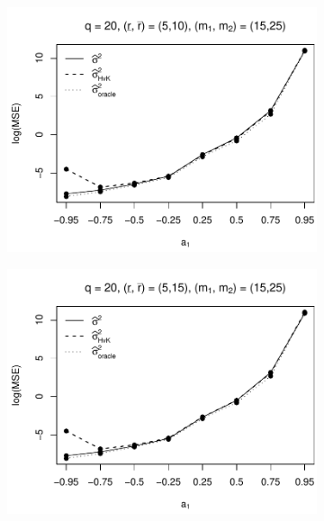 \begin{figure}[p]
\begin{subfigure}[b]{0.45\textwidth}
\includegraphics[width=\textwidth]{Plots/Plots_Supplement/MSE_lrv_T=500_slope=1_(L1,L2,K1,K2,M1,M2)=(20,20,5,10,15,25).pdf}
\end{subfigure}
\hspace{0.25cm}
\begin{subfigure}[b]{0.45\textwidth}
\includegraphics[width=\textwidth]{Plots/Plots_Supplement/MSE_lrv_T=500_slope=1_(L1,L2,K1,K2,M1,M2)=(20,20,5,15,15,25).pdf}
\end{subfigure}


\end{figure}
